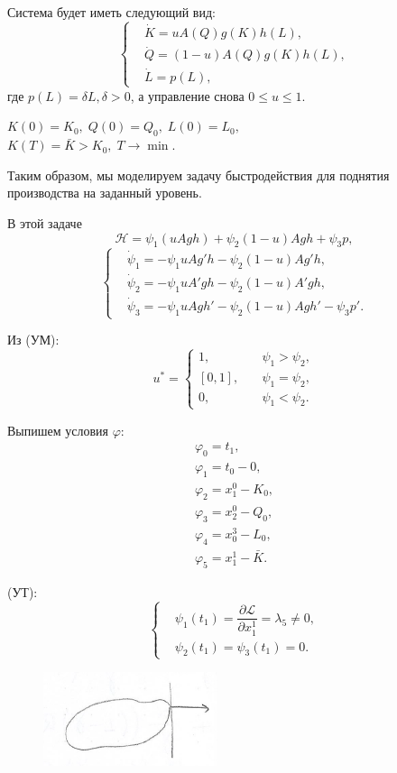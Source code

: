 \documentclass[12pt, a4paper]{article}
\theoremstyle{rusdef}
\renewcommand{\H}{\mathcal{H}} %
\renewcommand{\L}{\mathscr{L}} %
\renewcommand{\d}{\partial} %
\begin{document}
Система будет иметь следующий вид:
\[
  \left\{
    \begin{aligned}
      &\dot{K} = uA(Q)g(K)h(L), \\
      &\dot{Q} = (1-u)A(Q)g(K)h(L), \\
      &\dot{L} = p(L),
    \end{aligned}
  \right.
\]
где $p(L) = \delta L, \delta > 0$, а управление снова $0 \leqslant u \leqslant 1$.

$K(0) = K_0,\; Q(0) = Q_0,\; L(0) = L_0,$\\
$K(T) = \bar{K} > K_0,\; T \to \min$.

Таким образом, мы моделируем задачу быстродействия для поднятия производства на заданный уровень.

В этой задаче
\[
  \H = \psi_1(uAgh) + \psi_2(1 - u)Agh + \psi_3 p,
\]
\[
  \left\{
    \begin{aligned}
      &\dot{\psi}_1 = -\psi_1 uAg'h - \psi_2(1-u)Ag'h, \\
      &\dot{\psi}_2 = -\psi_1 uA'gh - \psi_2(1-u)A'gh, \\
      &\dot{\psi}_3 = -\psi_1 uAgh' - \psi_2(1-u)Agh' - \psi_3 p'.
    \end{aligned}
  \right.
\]

Из (УМ):
\[
  u^* =
  \left\{
    \begin{aligned}
      1, &\quad \psi_1 > \psi_2,\\
      [0,1], &\quad \psi_1 = \psi_2,\\
      0, &\quad \psi_1 < \psi_2.
    \end{aligned}
  \right.
\]

Выпишем условия $\varphi$:
\begin{gather*}
  \varphi_0 = t_1, \\
  \varphi_1 = t_0 - 0, \\
  \varphi_2 = x_1^0 - K_0, \\
  \varphi_3 = x_2^0 - Q_0, \\
  \varphi_4 = x^3_0 - L_0, \\
  \varphi_5 = x^1_1 - \bar{K}.
\end{gather*}

(УТ):
\[
  \left\{
    \begin{aligned}
      &\psi_1(t_1) = \dfrac{\d \L}{\d x^1_1} = \lambda_5 \neq 0, \\
      &\psi_2(t_1) = \psi_3(t_1) = 0.
    \end{aligned}
  \right.
\]

\begin{figure}[ht]
  \center
  \includegraphics{pic4.png}
\end{figure}
\end{document}
